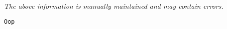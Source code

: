 \label{pkg:oop}

{\tiny \it The above information is manually maintained and may contain errors.}
\begin{verbatim}
Oop
\end{verbatim}
